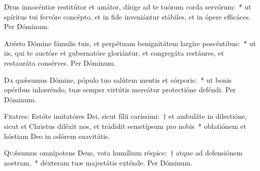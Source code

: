 \documentclass[vesperale_romanum.tex]{subfiles}
\begin{document}
\oratio

\lettrine{D}{e}us innocéntiæ restitútor et amátor, dírige ad te tuórum corda servórum:~* ut spíritus tui fervóre concépto, et in fide inveniántur stábiles, et in ópere efficáces. Per Dóminum.



\oratio

\lettrine{A}{d}ésto Dómine fámulis tuis, et perpétuam benignitátem largíre poscéntibus:~* ut iis, qui te auctóre et gubernatóre gloriántur, et congregáta restáures, et restauráta consérves. Per Dóminum.



\oratio

\lettrine{D}{a} quǽsumus Dómine, pópulo tuo salútem mentis et córporis:~* ut bonis opéribus inhæréndo, tuæ semper virtútis mereátur prote\-ctióne deféndi. Per Dóminum.



\lettrine{F}{r}atres: Estóte imitatóres Dei, sicut fílii caríssimi:~† et ambuláte in dilectióne, sicut et Christus diléxit nos, et trádidit semetípsum pro nobis~* oblatiónem et hóstiam Deo in odórem suavitátis.



\oratio

\lettrine{Q}{u}ǽsumus omnípotens Deus, vota humílium réspice:~† atque ad defensiónem nostram,~* déxteram tuæ majestátis exténde.
Per Dóminum.




\end{document}
